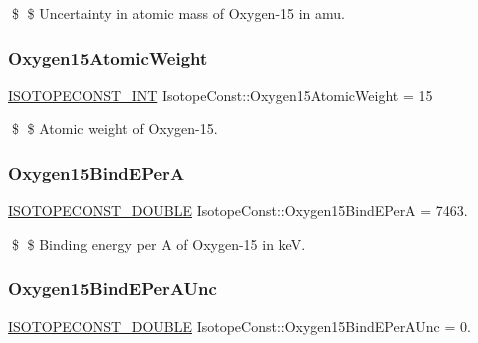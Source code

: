 \$ \$ Uncertainty in atomic mass of Oxygen-\/15 in amu. \mbox{\label{group___isotope_const-_oxygen-_o15_gaccb8bfae9b0dbcf65cbfe93d572240ff}} 
\subsubsection{\texorpdfstring{Oxygen15\+Atomic\+Weight}{Oxygen15AtomicWeight}}
{\footnotesize\ttfamily \mbox{\hyperlink{group___isotope_const-_macros_ga5f18360b3e99483a35c32d789e62621c}{I\+S\+O\+T\+O\+P\+E\+C\+O\+N\+S\+T\+\_\+\+I\+NT}} Isotope\+Const\+::\+Oxygen15\+Atomic\+Weight = 15}

\$ \$ Atomic weight of Oxygen-\/15. \mbox{\label{group___isotope_const-_oxygen-_o15_ga40bfc8ab0102bf554b81e10c0ad926b4}} 
\subsubsection{\texorpdfstring{Oxygen15\+Bind\+E\+PerA}{Oxygen15BindEPerA}}
{\footnotesize\ttfamily \mbox{\hyperlink{group___isotope_const-_macros_ga8f45a7272ce02c0b4c65c44636ed719a}{I\+S\+O\+T\+O\+P\+E\+C\+O\+N\+S\+T\+\_\+\+D\+O\+U\+B\+LE}} Isotope\+Const\+::\+Oxygen15\+Bind\+E\+PerA = 7463.}

\$ \$ Binding energy per A of Oxygen-\/15 in keV. \mbox{\label{group___isotope_const-_oxygen-_o15_ga580ac1b18980e0d72f6484f08bb28362}} 
\subsubsection{\texorpdfstring{Oxygen15\+Bind\+E\+Per\+A\+Unc}{Oxygen15BindEPerAUnc}}
{\footnotesize\ttfamily \mbox{\hyperlink{group___isotope_const-_macros_ga8f45a7272ce02c0b4c65c44636ed719a}{I\+S\+O\+T\+O\+P\+E\+C\+O\+N\+S\+T\+\_\+\+D\+O\+U\+B\+LE}} Isotope\+Const\+::\+Oxygen15\+Bind\+E\+Per\+A\+Unc = 0.}

